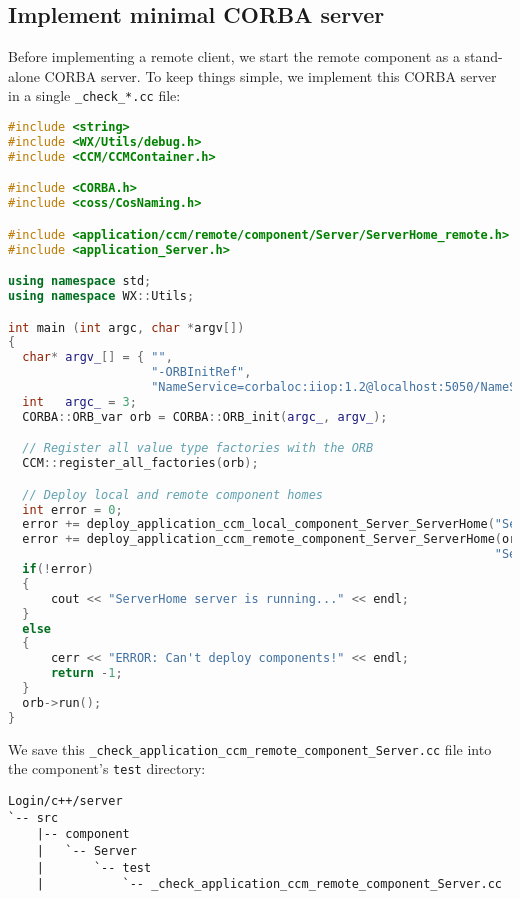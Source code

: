 \subsection{Implement minimal CORBA server}
\label{subsection:ImplementMinimalCorbaAserver}

Before implementing a remote client, we start the remote component as a
stand-alone CORBA server.
To keep things simple, we implement this CORBA server in a single 
{\tt \_check\_*.cc} file:
\begin{footnotesize}
\begin{lstlisting}[language=C++]
#include <string>
#include <WX/Utils/debug.h>
#include <CCM/CCMContainer.h>

#include <CORBA.h>
#include <coss/CosNaming.h>

#include <application/ccm/remote/component/Server/ServerHome_remote.h>
#include <application_Server.h>

using namespace std;
using namespace WX::Utils;

int main (int argc, char *argv[])
{
  char* argv_[] = { "", 
                    "-ORBInitRef", 
                    "NameService=corbaloc:iiop:1.2@localhost:5050/NameService"}; 
  int   argc_ = 3;
  CORBA::ORB_var orb = CORBA::ORB_init(argc_, argv_);

  // Register all value type factories with the ORB  
  CCM::register_all_factories(orb);

  // Deploy local and remote component homes	
  int error = 0;
  error += deploy_application_ccm_local_component_Server_ServerHome("ServerHome");
  error += deploy_application_ccm_remote_component_Server_ServerHome(orb, 
                                                                    "ServerHome");
  if(!error) 
  {
      cout << "ServerHome server is running..." << endl;
  }
  else 
  {
      cerr << "ERROR: Can't deploy components!" << endl;
      return -1;
  }
  orb->run();
}
\end{lstlisting}
\end{footnotesize}

We save this {\tt \_check\_application\_ccm\_remote\_component\_Server.cc} file
into the component's {\tt test} directory:
\begin{verbatim}
Login/c++/server
`-- src
    |-- component
    |   `-- Server
    |       `-- test
    |           `-- _check_application_ccm_remote_component_Server.cc
\end{verbatim}


